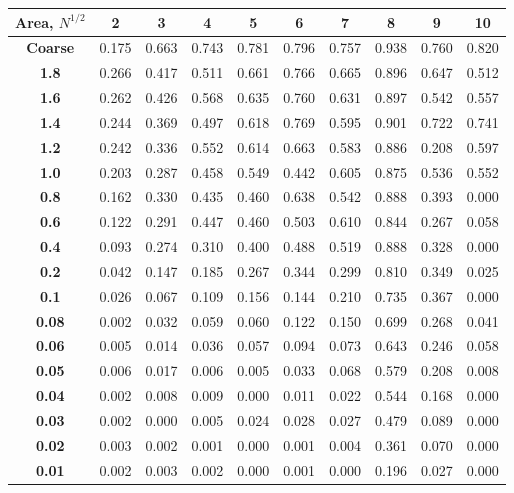 \documentclass[letterpaper]{mandc2019}
\begin{document}
{\begin{table}[htb]
{\begin{tabular}{c|c|c|c|c|c|c|c|c|c} 
\bf Area, $N^{1/2}$ & \bf  2 & \bf 3    &  \bf  4   &  \bf  5   &  \bf 6    &  \bf  7   &   \bf 8   &  \bf 9    &  \bf 10   \\ \hline \hline
\bf Coarse& 0.175 & 0.663 & 0.743 & 0.781 & 0.796 & 0.757 & 0.938 & 0.760 & 0.820 \\ \hline 
  \bf 1.8& 0.266 & 0.417 & 0.511 & 0.661 & 0.766 & 0.665 & 0.896 & 0.647 & 0.512 \\ \hline 
  \bf 1.6& 0.262 & 0.426 & 0.568 & 0.635 & 0.760 & 0.631 & 0.897 & 0.542 & 0.557 \\ \hline 
  \bf 1.4& 0.244 & 0.369 & 0.497 & 0.618 & 0.769 & 0.595 & 0.901 & 0.722 & 0.741 \\ \hline 
  \bf 1.2& 0.242 & 0.336 & 0.552 & 0.614 & 0.663 & 0.583 & 0.886 & 0.208 & 0.597 \\ \hline 
  \bf 1.0& 0.203 & 0.287 & 0.458 & 0.549 & 0.442 & 0.605 & 0.875 & 0.536 & 0.552 \\ \hline 
  \bf 0.8& 0.162 & 0.330 & 0.435 & 0.460 & 0.638 & 0.542 & 0.888 & 0.393 & 0.000 \\ \hline 
  \bf 0.6& 0.122 & 0.291 & 0.447 & 0.460 & 0.503 & 0.610 & 0.844 & 0.267 & 0.058 \\ \hline 
  \bf 0.4& 0.093 & 0.274 & 0.310 & 0.400 & 0.488 & 0.519 & 0.888 & 0.328 & 0.000 \\ \hline 
  \bf 0.2& 0.042 & 0.147 & 0.185 & 0.267 & 0.344 & 0.299 & 0.810 & 0.349 & 0.025 \\ \hline 
  \bf 0.1& 0.026 & 0.067 & 0.109 & 0.156 & 0.144 & 0.210 & 0.735 & 0.367 & 0.000 \\ \hline 
  \bf 0.08&0.002 & 0.032 & 0.059 & 0.060 & 0.122 & 0.150 & 0.699 & 0.268 & 0.041 \\ \hline 
  \bf 0.06&0.005 & 0.014 & 0.036 & 0.057 & 0.094 & 0.073 & 0.643 & 0.246 & 0.058 \\ \hline 
  \bf 0.05&0.006 & 0.017 & 0.006 & 0.005 & 0.033 & 0.068 & 0.579 & 0.208 & 0.008 \\ \hline 
  \bf 0.04&0.002 & 0.008 & 0.009 & 0.000 & 0.011 & 0.022 & 0.544 & 0.168 & 0.000 \\ \hline 
  \bf 0.03&0.002 & 0.000 & 0.005 & 0.024 & 0.028 & 0.027 & 0.479 & 0.089 & 0.000 \\ \hline 
  \bf 0.02&0.003 & 0.002 & 0.001 & 0.000 & 0.001 & 0.004 & 0.361 & 0.070 & 0.000 \\ \hline 
  \bf 0.01&0.002 & 0.003 & 0.002 & 0.000 & 0.001 & 0.000 & 0.196 & 0.027 & 0.000 \\ \hline 


\end{tabular}}
\end{table}}
\end{document}

